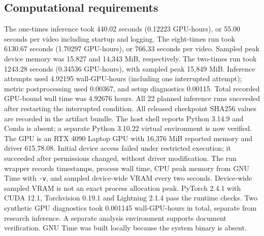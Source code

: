 \subsection{Computational requirements}
The one-times inference took 440.02 seconds (0.12223 GPU-hours), or 55.00 seconds per video including startup and logging. The eight-times run took 6130.67 seconds (1.70297 GPU-hours), or 766.33 seconds per video. Sampled peak device memory was 15,827 and 14,343 MiB, respectively. The two-times run took 1243.28 seconds (0.34536 GPU-hours), with sampled peak 15,849 MiB. Inference attempts used 4.92195 wall-GPU-hours (including one interrupted attempt); metric postprocessing used 0.00367, and setup diagnostics 0.00115. Total recorded GPU-bound wall time was 4.92676 hours. All 22 planned inference runs succeeded after restarting the interrupted condition.  All released checkpoint SHA256 values are recorded in the artifact bundle. The host shell reports Python 3.14.9 and Conda is absent; a separate Python 3.10.22 virtual environment is now verified. The GPU is an RTX 4090 Laptop GPU with 16,376 MiB reported memory and driver 615.78.08. Initial device access failed under restricted execution; it succeeded after permissions changed, without driver modification. The run wrapper records timestamps, process wall time, CPU peak memory from GNU Time with \texttt{-v}, and sampled device-wide VRAM every two seconds. Device-wide sampled VRAM is not an exact process allocation peak. PyTorch 2.4.1 with CUDA 12.1, Torchvision 0.19.1 and Lightning 2.1.4 pass the runtime checks. Two synthetic GPU diagnostics took 0.001145 wall-GPU-hours in total, separate from research inference. A separate analysis environment supports document verification. GNU Time was built locally because the system binary is absent.
